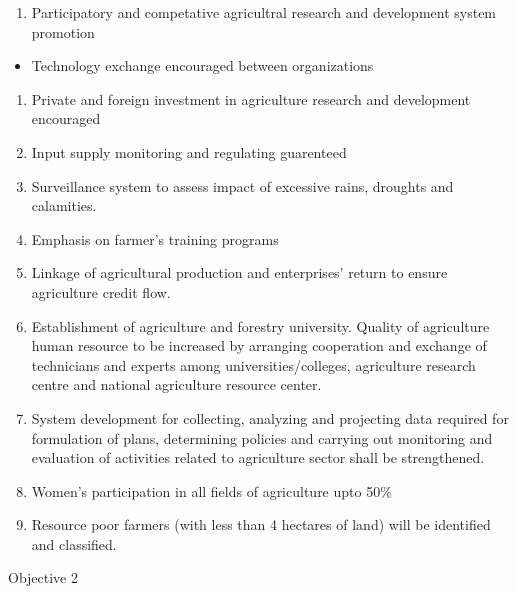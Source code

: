\documentclass[
]{book}
\providecommand{\tightlist}{%
  \setlength{\itemsep}{0pt}\setlength{\parskip}{0pt}}
\begin{document}
\begin{itemize}
  \begin{enumerate}
  \def\labelenumi{\arabic{enumi}.}
  \setcounter{enumi}{8}
  \tightlist
  \item
    Participatory and competative agricultral research and development system promotion
  \end{enumerate}

  \begin{itemize}
  \tightlist
  \item
    Technology exchange encouraged between organizations
  \end{itemize}

  \begin{enumerate}
  \def\labelenumi{\arabic{enumi}.}
  \setcounter{enumi}{9}
  \tightlist
  \item
    Private and foreign investment in agriculture research and development encouraged
  \item
    Input supply monitoring and regulating guarenteed
  \item
    Surveillance system to assess impact of excessive rains, droughts and calamities.
  \item
    Emphasis on farmer's training programs
  \item
    Linkage of agricultural production and enterprises' return to ensure agriculture credit flow.
  \item
    Establishment of agriculture and forestry university. Quality of agriculture human resource to be increased by arranging cooperation and exchange of technicians and experts among universities/colleges, agriculture research centre and national agriculture resource center.
  \item
    System development for collecting, analyzing and projecting data required for formulation of plans, determining policies and carrying out monitoring and evaluation of activities related to agriculture sector shall be strengthened.
  \item
    Women's participation in all fields of agriculture upto 50\%
  \item
    Resource poor farmers (with less than 4 hectares of land) will be identified and classified.
  \end{enumerate}
\end{itemize}

Objective 2
\end{document}
